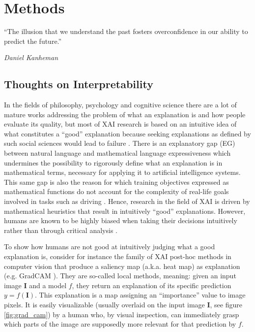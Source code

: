 \chapter{Methods}
\label{chap:methods}

\epigraph{\enquote{The illusion that we understand the past fosters overconfidence in our ability to predict the future.}}{\emph{Daniel Kanheman}}

\section{Thoughts on Interpretability}
In the fields of philosophy, psychology and cognitive science there are a lot of mature works addressing the problem of what an explanation is and how people evaluate its quality, but most of XAI research is based on an intuitive idea of what constitutes a “good” explanation because seeking explanations as defined by such social sciences would lead to failure \cite{Miller}.
There is an explanatory gap (EG) between natural language and mathematical language expressiveness which undermines the possibility to rigorously define what an explanation is in mathematical terms, necessary for applying it to artificial intelligence systems.
This same gap is also the reason for which training objectives expressed as mathematical functions do not account for the complexity of real-life goals involved in tasks such as driving \cite{Zablocki2022}.
Hence, research in the field of XAI is driven by mathematical heuristics that result in intuitively “good” explanations.
However, humans are known to be highly biased when taking their decisions intuitively rather than through critical analysis \cite{Kahneman}. 

To show how humans are not good at intuitively judging what a good explanation is, consider for instance the family of XAI post-hoc methods in computer vision that produce a saliency map (a.k.a. heat map) as explanation (e.g. GradCAM \cite{GradCAM}).
They are so-called local methods, meaning: given an input image $\mathbf{I}$ and a model $f$, they return an explanation of its specific prediction $y = f(\mathbf{I})$.
This explanation is a map assigning an “importance” value to image pixels.
It is easily visualizable (usually overlaid on the input image $\mathbf{I}$, see figure \ref{fig:grad_cam}) by a human who, by visual inspection, can immediately grasp which parts of the image are supposedly more relevant for that prediction by $f$.

